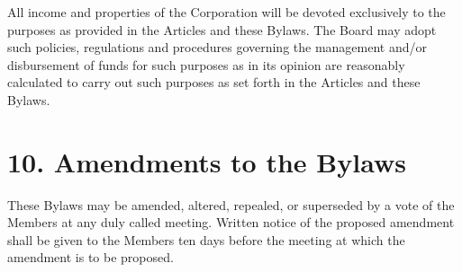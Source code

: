 \documentclass[
]{book}
\begin{document}
All income and properties of the Corporation will be devoted exclusively to the purposes as provided in the Articles and these Bylaws. The Board may adopt such policies, regulations and procedures governing the management and/or disbursement of funds for such purposes as in its opinion are reasonably calculated to carry out such purposes as set forth in the Articles and these Bylaws.

\section{10. Amendments to the Bylaws}\label{amendments-to-the-bylaws}

These Bylaws may be amended, altered, repealed, or superseded by a vote of the Members at any duly called meeting. Written notice of the proposed amendment shall be given to the Members ten days before the meeting at which the amendment is to be proposed.
\end{document}
